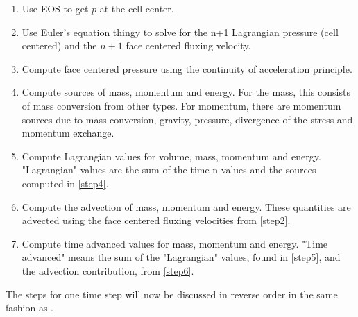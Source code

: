 \documentclass[fleqn]{article}
\begin{document}
\begin{enumerate}
\item{Use EOS to get $p$ at the cell center.}
\item{Use Euler's equation thingy to solve for the n+1 Lagrangian pressure (cell centered) and the $n+1$ face centered fluxing velocity.}
\item{Compute face centered pressure using the continuity of acceleration principle.}
\item{Compute sources of mass, momentum and energy.  For the mass, this consists of mass conversion from other types.  For momentum, there are momentum sources due to mass conversion, gravity, pressure, divergence of the stress and momentum exchange.}
\item{Compute Lagrangian values for volume, mass, momentum and energy.  "Lagrangian" values are the sum of the time n values and the sources computed in \ref{step4}.}
\item{Compute the advection of mass, momentum and energy.  These quantities are advected using the face centered fluxing velocities from \ref{step2}.}
\item{ Compute time advanced values for mass, momentum and energy. "Time advanced" means the sum of the "Lagrangian" values, found in \ref{step5}, and the advection contribution, from \ref{step6}.}
\end{enumerate}
\normalfont
The steps for one time step will now be discussed in reverse order in the
same fashion as .
%
%
%
%
\end{document}

